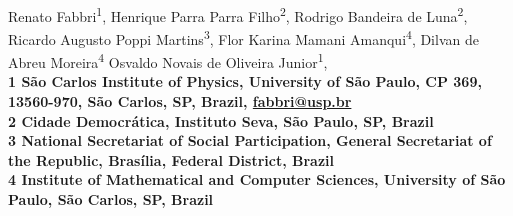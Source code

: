 \documentclass[10pt,letterpaper]{article}
\date{}
\begin{document}
\vspace*{0.35in}

\begin{flushleft}
{\Large
\textbf{}
}
\newline
\\
Renato Fabbri\textsuperscript{1},
Henrique Parra Parra Filho\textsuperscript{2},
Rodrigo Bandeira de Luna\textsuperscript{2},
Ricardo Augusto Poppi Martins\textsuperscript{3},
Flor Karina Mamani Amanqui\textsuperscript{4},
Dilvan de Abreu Moreira\textsuperscript{4}
Osvaldo Novais de Oliveira Junior\textsuperscript{1},
\\
\bigskip
\bf{1} S\~ao Carlos Institute of Physics, University of S\~ao Paulo, CP 369, 13560-970, S\~ao Carlos, SP, Brazil, \url{fabbri@usp.br}
\\
\bf{2} Cidade Democr\'atica, Instituto Seva, S\~ao Paulo, SP, Brazil
\\
\bf{3} National Secretariat of Social Participation, General Secretariat of the Republic, Bras\'ilia, Federal District, Brazil
\\
\bf{4}  Institute of Mathematical and Computer Sciences, University of São Paulo, S\~ao Carlos, SP, Brazil
\\
\bigskip

% 
%



%
%

\end{flushleft}
\end{document}
